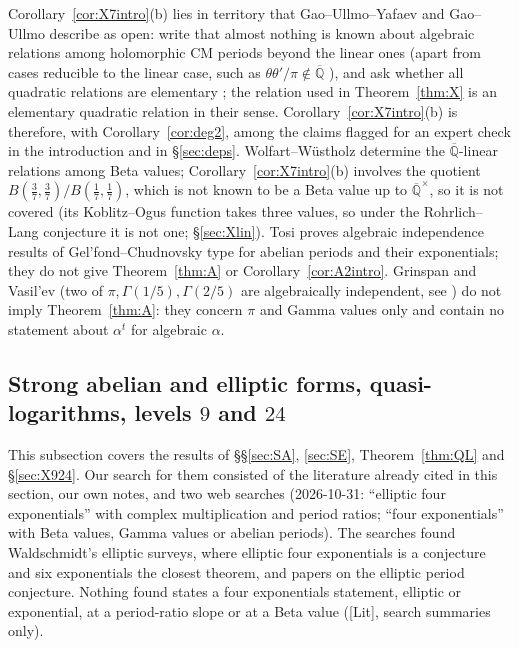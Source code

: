 \documentclass[11pt]{amsart}
\theoremstyle{definition}
\newcommand{\Qb}{\overline{\mathbb{Q}}}
\newcommand{\lab}[1]{\textup{[#1]}}
\begin{document}
Corollary~\ref{cor:X7intro}(b) lies in territory that Gao--Ullmo--Yafaev \cite{GUY} and Gao--Ullmo \cite{GU} describe as
open: \cite{GUY} write that almost nothing is known about algebraic relations among holomorphic CM periods beyond the linear ones
(apart from cases reducible to the linear case, such as $\theta\theta'/\pi\notin\Qb$ \cite[Cor.~3.1]{GUY}), and ask whether
all quadratic relations are elementary \cite[Question~1.3]{GUY}; the relation used in Theorem~\ref{thm:X} is an elementary
quadratic relation in their sense. Corollary~\ref{cor:X7intro}(b) is therefore, with Corollary~\ref{cor:deg2}, among the
claims flagged for an expert check in the introduction and in \S\ref{sec:deps}. Wolfart--W\"ustholz \cite{WW85} determine the $\Qb$-linear relations among
Beta values; Corollary~\ref{cor:X7intro}(b) involves the quotient $B(\frac37,\frac37)/B(\frac17,\frac17)$, which is not known
to be a Beta value up to $\Qb^\times$, so it is not covered (its Koblitz--Ogus function takes three values, so under the
Rohrlich--Lang conjecture it is not one; \S\ref{sec:Xlin}). Tosi \cite{To23} proves algebraic independence results of
Gel'fond--Chudnovsky type for abelian periods and their exponentials; they do not give Theorem~\ref{thm:A} or
Corollary~\ref{cor:A2intro}. Grinspan and Vasil'ev (two of $\pi,\Gamma(1/5),\Gamma(2/5)$ are algebraically independent, see
\cite[\S3]{Wper05}) do not imply Theorem~\ref{thm:A}: they concern $\pi$ and Gamma values only and contain no statement
about $\alpha^t$ for algebraic $\alpha$.

\subsection{Strong abelian and elliptic forms, quasi-logarithms, levels $9$ and $24$}\label{sec:novH1}
This subsection covers the results of \S\S\ref{sec:SA}, \ref{sec:SE}, Theorem~\ref{thm:QL} and \S\ref{sec:X924}. Our
search for them consisted of the literature already cited in this section, our own notes, and two web searches (2026-10-31:
``elliptic four exponentials'' with complex multiplication and period ratios; ``four exponentials'' with Beta values, Gamma
values or abelian periods). The searches found Waldschmidt's elliptic surveys, where elliptic four exponentials is a
conjecture and six exponentials the closest theorem, and papers on the elliptic period conjecture. Nothing found states a
four exponentials statement, elliptic or exponential, at a period-ratio slope or at a Beta value (\lab{Lit}, search
summaries only).
\end{document}
